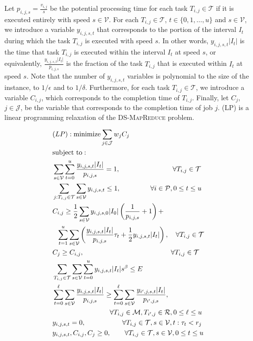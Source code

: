 \documentclass{llncs}
\newcommand{\dmr}{\textsc{DS-MapReduce}\xspace}
\begin{document}
Let $p_{i,j,s} = \frac{v_{i,j}}{s}$ be the potential processing time for each task $T_{i,j} \in \mathcal{T}$
if it is executed entirely with speed $s \in \mathcal{V}$.
For each $T_{i,j}\in \mathcal{T}$, $t \in \{0,1,\ldots,u\}$ and $s\in \mathcal{V}$,
we introduce a variable $y_{i,j,s,t}$ that corresponds to the portion of the interval $I_t$ during which the task $T_{i,j}$ is executed with speed $s$.
In other words, $y_{i,j,s,t}|I_t|$ is the time that task $T_{i,j}$ is executed within the interval $I_t$ at speed $s$,
or equivalently, $\frac{y_{i,j,s,t}|I_t|}{p_{i,j,s}}$ is the fraction of the task $T_{i,j}$ that is executed within $I_t$ at speed $s$.
Note that the number of $y_{i,j,s,t}$ variables is polynomial to the size of the instance, to $1/\epsilon$ and to $1/\delta$.
Furthermore, for each task $T_{i,j} \in \mathcal{T}$, we introduce a variable $C_{i,j}$, which corresponds to the completion time of $T_{i,j}$.
Finally, let $C_j$, $j\in \mathcal{J}$, be the variable that corresponds to the completion time of job $j$.
(LP) is a linear programming relaxation of the \dmr problem.
\begin{figure}
\begin{alignat}{2}
 & (LP): \text{minimize} \sum_{j\in \mathcal{J}} w_j C_j \notag\\
 & \text{subject to}: \notag\\
 & \sum_{s\in \mathcal{V}} \sum_{t=0}^u \frac{y_{i,j,s,t}|I_t|}{p_{i,j,s}} = 1, ~~~~~~~~~~~~~~~~~~~~~~~ \forall T_{i,j}\in \mathcal{T} \label{lp:p1}\\
 & \sum_{j:T_{i,j}\in \mathcal{T}}\sum_{s\in \mathcal{V}} y_{i,j,s,t} \leq 1, ~~~~~~~~~~~~~ \forall i\in \mathcal{P}, 0 \leq t \leq u \label{lp:p2}\\
 & C_{i,j} \geq \frac{1}{2} \sum_{s\in \mathcal{V}} y_{i,j,s,0}|I_0| \left(\frac{1}{p_{i,j,s}} + 1 \right) + \notag\\
 & ~~ \sum_{t=1}^u \sum_{s\in \mathcal{V}} \left(\frac{y_{i,j,s,t}|I_t|}{p_{i,j,s}}\tau_t + \frac{1}{2} y_{i,j,s,t}|I_t|\right), ~~~ \forall T_{i,j}\in \mathcal{T} \label{lp:p3}\\
 & C_{j} \geq C_{i,j}, ~~~~~~~~~~~~~~~~~~~~~~~~~~~~~~~~~~~~~~ \forall T_{i,j}\in \mathcal{T} \label{lp:p4}\\
 & \sum_{T_{i,j}\in\mathcal{T}}\sum_{s\in\mathcal{V}}\sum_{t=0}^u y_{i,j,s,t}|I_t| s^{\beta} \leq E \label{lp:p5}\\
 & \sum_{t=0}^{\ell} \sum_{s \in \mathcal{V}} \frac{y_{i,j,s,t}|I_t|}{p_{i,j,s}} \geq \sum_{t=0}^{\ell} \sum_{s \in \mathcal{V}} \frac{y_{i',j,s,t}|I_t|}{p_{i',j,s}}, \notag\\
 & ~~~~~~~~~~~~~~~~~~~~~~~~~ \forall T_{i,j} \in \mathcal{M}, T_{i',j} \in \mathcal{R}, 0 \leq \ell \leq u\label{lp:p6}\\
 & y_{i,j,s,t} = 0, ~~~~~~~~~~~~~~~~ \forall T_{i,j} \in \mathcal{T}, s \in \mathcal{V}, t:\tau_t<r_j \label{lp:p7}\\
 & y_{i,j,s,t}, C_{i,j}, C_j \geq 0, ~~~~~~ \forall T_{i,j} \in \mathcal{T}, s \in \mathcal{V}, 0 \leq t \leq u
\end{alignat}
\end{figure}
\end{document}

